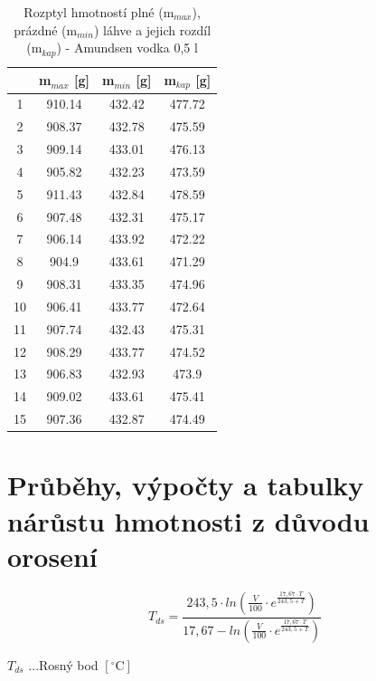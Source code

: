 \begin{table}[h]
    \centering
    \begin{tabular}{|c|c|c|c|}
        \hline
         & \textbf{m$_{max}$ [g]} & \textbf{m$_{min}$ [g]} & \textbf{m$_{kap}$ [g]} \\ \hline \hline
        1 & 910.14 & 432.42 & 477.72 \\ \hline
        2 & 908.37 & 432.78 & 475.59 \\ \hline
        3 & 909.14 & 433.01 & 476.13 \\ \hline
        4 & 905.82 & 432.23 & 473.59 \\ \hline
        5 & 911.43 & 432.84 & 478.59 \\ \hline
        6 & 907.48 & 432.31 & 475.17 \\ \hline
        7 & 906.14 & 433.92 & 472.22 \\ \hline
        8 & 904.9 & 433.61 & 471.29 \\ \hline
        9 & 908.31 & 433.35 & 474.96 \\ \hline
        10 & 906.41 & 433.77 & 472.64 \\ \hline
        11 & 907.74 & 432.43 & 475.31 \\ \hline
        12 & 908.29 & 433.77 & 474.52 \\ \hline
        13 & 906.83 & 432.93 & 473.9 \\ \hline
        14 & 909.02 & 433.61 & 475.41 \\ \hline
        15 & 907.36 & 432.87 & 474.49 \\ \hline
    \end{tabular}
    \caption{Rozptyl hmotností plné (m$_{max}$), prázdné (m$_{min}$) láhve a jejich rozdíl (m$_{kap}$) - Amundsen vodka 0,5 l}
    \label{tab:placeholder_label}
\end{table}


\section{Průběhy, výpočty a tabulky nárůstu hmotnosti z důvodu orosení}

\begin{equation}
T_{ds} = \frac{243,5 \cdot ln(\frac{V}{100} \cdot e^{\frac{17,67 \cdot T}{243,5 + T}})}{17,67 - ln(\frac{V}{100} \cdot e^{\frac{17,67 \cdot T}{243,5 + T}})}
\label{rosný bod obecne}
\end{equation}

\(T_{ds}\) ...Rosný bod \([\mathrm{^\circ C}]\)

